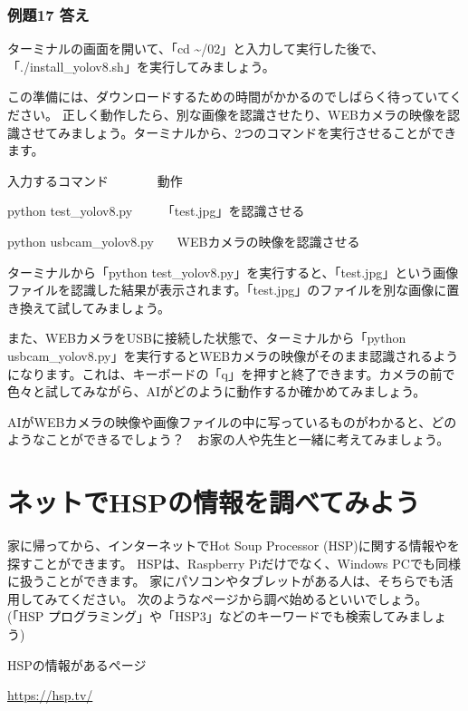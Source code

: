 \documentclass[text02.tex]{subfiles}
\begin{document}
\subsubsection*{例題17 答え}

ターミナルの画面を開いて、「cd \textasciitilde /02」と入力して実行した後で、「./install\_yolov8.sh」を実行してみましょう。

この準備には、ダウンロードするための時間がかかるのでしばらく待っていてください。
正しく動作したら、別な画像を認識させたり、WEBカメラの映像を認識させてみましょう。ターミナルから、2つのコマンドを実行させることができます。

\begin{description}
    \item 入力するコマンド \ \ \ \ \ \ \ 動作
    \item python test\_yolov8.py \ \ \ \ 「test.jpg」を認識させる
    \item python usbcam\_yolov8.py \ \ \ WEBカメラの映像を認識させる
\end{description}

ターミナルから「python test\_yolov8.py」を実行すると、「test.jpg」という画像ファイルを認識した結果が表示されます。「test.jpg」のファイルを別な画像に置き換えて試してみましょう。

また、WEBカメラをUSBに接続した状態で、ターミナルから「python usbcam\_yolov8.py」を実行するとWEBカメラの映像がそのまま認識されるようになります。これは、キーボードの「q」を押すと終了できます。カメラの前で色々と試してみながら、AIがどのように動作するか確かめてみましょう。

AIがWEBカメラの映像や画像ファイルの中に写っているものがわかると、どのようなことができるでしょう？　お家の人や先生と一緒に考えてみましょう。


\clearpage
\section{ネットでHSPの情報を調べてみよう}

家に帰ってから、インターネットでHot Soup Processor (HSP)に関する情報やを探すことができます。
HSPは、Raspberry Piだけでなく、Windows PCでも同様に扱うことができます。
家にパソコンやタブレットがある人は、そちらでも活用してみてください。
次のようなページから調べ始めるといいでしょう。(「HSP プログラミング」や「HSP3」などのキーワードでも検索してみましょう)

HSPの情報があるページ

\url{https://hsp.tv/}
\end{document}

